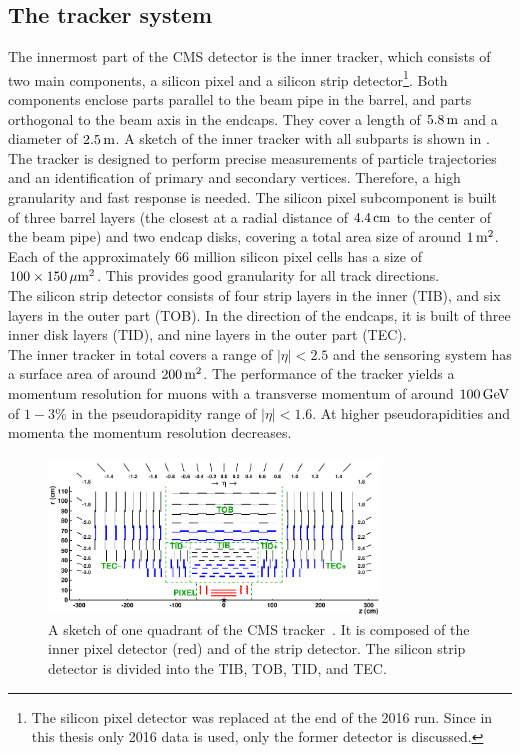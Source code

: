 \subsection{The tracker system}
The innermost part of the CMS detector is the inner tracker, which consists of two main components, a silicon pixel and a silicon strip detector\footnote{The silicon pixel detector was replaced at the end of the 2016 run. Since in this thesis only 2016 data is used, only the former detector is discussed.}. Both components enclose parts parallel to the beam pipe in the barrel, and parts orthogonal to the beam axis in the endcaps. They cover a length of $5.8\,\text{m}$ and a diameter of $2.5\,\text{m}$. A sketch of the inner tracker with all subparts is shown in . The tracker is designed to perform precise measurements of particle trajectories and an identification of primary and secondary vertices. Therefore, a high granularity and fast response is needed. The silicon pixel subcomponent is built of three barrel layers (the closest at a radial distance of $4.4\,\text{cm}$ to the center of the beam pipe) and two endcap disks, covering a total area size of around $1\,\text{m}^2$. Each of the approximately $66$ million silicon pixel cells has a size of $100\times150\,\mu\text{m}^2$. This provides good granularity for all track directions.\\
The silicon strip detector consists of four strip layers in the inner (TIB), and six layers in the outer part (TOB). In the direction of the endcaps, it is built of three inner disk layers (TID), and nine layers in the outer part (TEC).\\
The inner tracker in total covers a range of $|\eta|<2.5$ and the sensoring system has a surface area of around $200\,\text{m}^2$. The performance of the tracker yields a momentum resolution for muons with a transverse momentum of around $100\,\text{Ge\hspace{-.08em}V}$ of $1-3\%$ in the pseudorapidity range of $|\eta|<1.6$. At higher pseudorapidities and momenta the momentum resolution decreases.

\begin{figure}[hbp]
 \centering
 \includegraphics[width=0.79\textwidth]{figures/general/tracker.pdf}
 \caption{A sketch of one quadrant of the CMS tracker~\cite{TrackerPDFPic}. It is composed of the inner pixel detector (red) and of the strip detector. The silicon strip detector is divided into the TIB, TOB, TID, and TEC.}
 \label{fig:tracker}
\end{figure}

